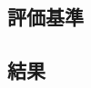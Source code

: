 \documentclass[a4j,11pt]{jarticle}
\def\proposed{DNRBA}
\begin{document}

\subsection{評価基準}
\label{ss:eval_criteria}



\subsection{結果}
\label{ss:results}


\FloatBarrier



\FloatBarrier
\end{document}
